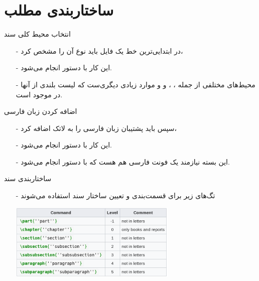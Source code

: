 \section{ساختاربندی مطلب}
\begin{frame}{انتخاب محیط کلی سند}
\begin{itemize}\itemr
\item[-] 
در ابتدایی‌ترین خط یک فایل 
باید نوع آن را مشخص کرد،

\item[-]
این کار با دستور 
انجام می‌شود.

\item[-]
محیط‌های مختلفی از جمله
،
،
 و
و موارد زیادی دیگری‌ست که لیست بلندی از آنها در 
\href{https://ctan.org/topic/class}{}
موجود است.
\end{itemize}
\end{frame}

\begin{frame}{اضافه کردن زبان فارسی}
\begin{itemize}\itemr
\item[-] 
سپس باید پشتیبان زبان فارسی را به لاتک اضافه کرد،

\item[-]
این کار با دستور 
انجام می‌شود.

\item[-]
این بسته نیازمند یک فونت فارسی هم هست که با دستور 
انجام می‌شود.
\end{itemize}
\end{frame}

\begin{frame}{ساختاربندی سند}\label{parts-chapters}
\begin{itemize}\itemr
\item[-]
تگ‌های زیر برای قسمت‌بندی و تعیین ساختار سند استفاده می‌شوند

\begin{center}
\includegraphics[width=0.63\textwidth, height=0.53\textheight]{docs/images/sections} 
\end{center}
\end{itemize}
\end{frame}

